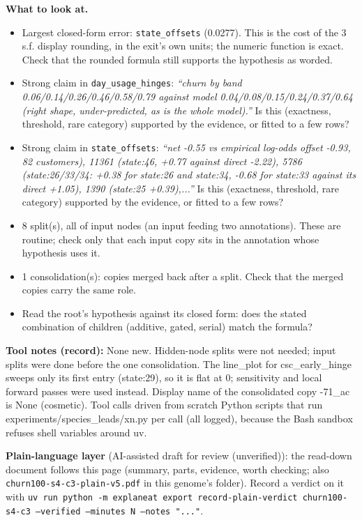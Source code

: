 \documentclass[a4paper,11pt]{article}
\begin{document}
\textbf{What to look at.}
\begin{itemize}
\item Largest closed-form error: \texttt{state\_\allowbreak{}offsets} (0.0277). This is the cost of the 3 s.f. display rounding, in the exit's own units; the numeric function is exact. Check that the rounded formula still supports the hypothesis as worded.
\item Strong claim in \texttt{day\_\allowbreak{}usage\_\allowbreak{}hinges}: \emph{``churn by band 0.06/\allowbreak{}0.14/\allowbreak{}0.26/\allowbreak{}0.46/\allowbreak{}0.58/\allowbreak{}0.79 against model 0.04/\allowbreak{}0.08/\allowbreak{}0.15/\allowbreak{}0.24/\allowbreak{}0.37/\allowbreak{}0.64 (right shape, under-predicted, as is the whole model).''} Is this (exactness, threshold, rare category) supported by the evidence, or fitted to a few rows?
\item Strong claim in \texttt{state\_\allowbreak{}offsets}: \emph{``net -0.55 vs empirical log-odds offset -0.93, 82 customers), 11361 (state:46, +0.77 against direct -2.22), 5786 (state:26/33/34: +0.38 for state:26 and state:34, -0.68 for state:33 against its direct +1.05), 1390 (state:25 +0.39),...''} Is this (exactness, threshold, rare category) supported by the evidence, or fitted to a few rows?
\item 8 split(s), all of input nodes (an input feeding two annotations). These are routine; check only that each input copy sits in the annotation whose hypothesis uses it.
\item 1 consolidation(s): copies merged back after a split. Check that the merged copies carry the same role.
\item Read the root's hypothesis against its closed form: does the stated combination of children (additive, gated, serial) match the formula?
\end{itemize}
\textbf{Tool notes (record):} None new. Hidden-node splits were not needed; input splits were done before the one consolidation. The line\_\allowbreak{}plot for csc\_\allowbreak{}early\_\allowbreak{}hinge sweeps only its first entry (state:29), so it is flat at 0; sensitivity and local forward passes were used instead. Display name of the consolidated copy -71\_\allowbreak{}ac is None (cosmetic). Tool calls driven from scratch Python scripts that run experiments/\allowbreak{}species\_\allowbreak{}leads/\allowbreak{}xn.py per call (all logged), because the Bash sandbox refuses shell variables around uv.

\textbf{Plain-language layer} (AI-assisted draft for review (unverified)): the read-down document follows this page (summary, parts, evidence, worth checking; also \texttt{churn100-s4-c3-plain-v5.pdf} in this genome's folder). Record a verdict on it with \texttt{uv run python -m explaneat export record-plain-verdict churn100-s4-c3 --verified --minutes N --notes "..."}.
\end{document}
